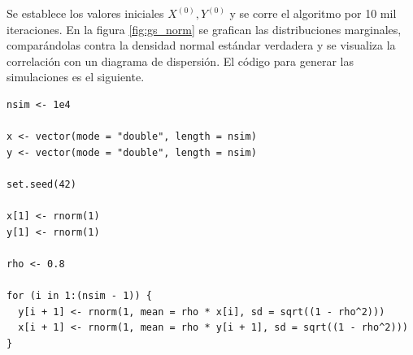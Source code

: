 \documentclass[11pt,a4paper]{article}
\begin{document}
Se establece los valores iniciales $X^{(0)}, Y^{(0)}$ y se corre el algoritmo por 10 mil iteraciones. En la figura \ref{fig:gs_norm} se grafican las distribuciones marginales, comparándolas contra la densidad normal estándar verdadera y se visualiza la correlación con un diagrama de dispersión. El código para generar las simulaciones es el siguiente.\\

\begin{lstlisting}
nsim <- 1e4

x <- vector(mode = "double", length = nsim)
y <- vector(mode = "double", length = nsim)

set.seed(42)

x[1] <- rnorm(1)
y[1] <- rnorm(1)

rho <- 0.8

for (i in 1:(nsim - 1)) {
  y[i + 1] <- rnorm(1, mean = rho * x[i], sd = sqrt((1 - rho^2)))
  x[i + 1] <- rnorm(1, mean = rho * y[i + 1], sd = sqrt((1 - rho^2)))
}
\end{lstlisting} \leavevmode\newline
\end{document}

